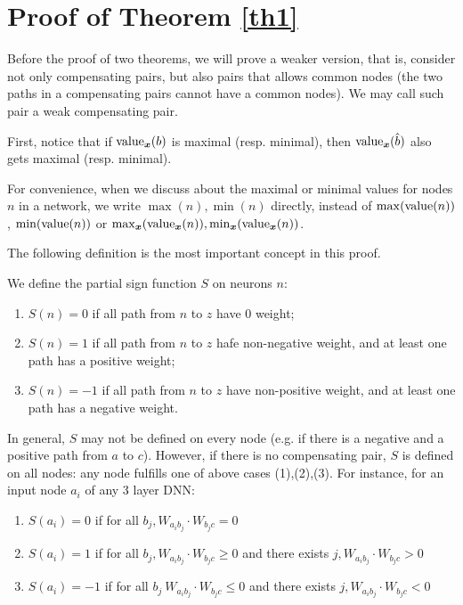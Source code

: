 	\section{Proof of Theorem \ref{th1}}	
	
	Before the proof of two theorems, we will prove a weaker version, that is, consider not only compensating pairs, but also pairs that allows common nodes (the two paths in a compensating pairs cannot have a common nodes). We may call such pair a weak compensating pair.
	
	
	First, notice that if ${\textrm{value}}_{\boldsymbol{x}}(b)$ is maximal (resp. minimal), 
	then ${\textrm{value}}_{\boldsymbol{x}}(\hat{b})$ also gets maximal (resp. minimal). 
	
	For convenience, when we discuss about the maximal or minimal values for nodes $n$ in a network, we write $\max(n),\min(n)$ directly, instead of $\max({\textrm{value}}(n))$, $\min({\textrm{value}}(n))$ or $\max_{\boldsymbol{x}}({\textrm{value}}_{\boldsymbol{x}}(n)),\min_{\boldsymbol{x}}({\textrm{value}}_{\boldsymbol{x}}(n))$.
	
	
	The following definition is the most important concept in this proof.
	
	\begin{definition}\label{sign_of_nodes}
		We define the partial sign function $S$ on neurons $n$: 	
		\begin{enumerate}
			 \item $S(n)=0$ if all path from $n$ to $z$ have 0 weight; 
			 \item $S(n)=1$ if all path from $n$ to $z$ hafe non-negative weight, and at least one path has a positive weight; 
			 \item $S(n)=-1$ if all path from $n$ to $z$ have non-positive weight, and at least one path has a negative weight. 
		\end{enumerate}
	\end{definition}
	
	In general, $S$ may not be defined on every node (e.g. if there is a negative and a positive path from $a$ to $c$). However, if there is no compensating pair, $S$ is defined on all nodes: any node fulfills one of above cases (1),(2),(3).
		For instance, for an input node $a_i$ of any 3 layer DNN:
		\begin{enumerate}
			\item  $S(a_i)=0$ if 
			for all $b_j, W_{a_i b_j}\cdot W_{b_j c} = 0$
			
			
			\item  $S(a_i)=1$ if for all $b_j, W_{a_i b_j}\cdot W_{b_j c} \geq 0$ and there exists 
			$j, W_{a_i b_j}\cdot W_{b_j c} > 0$
			
			\item $S(a_i)=-1$ if for all $b_j\ W_{a_i b_j}\cdot W_{b_j c} \leq 0$ and there exists 
			$j, W_{a_i b_j}\cdot W_{b_j c} < 0$ 
		\end{enumerate}
		
